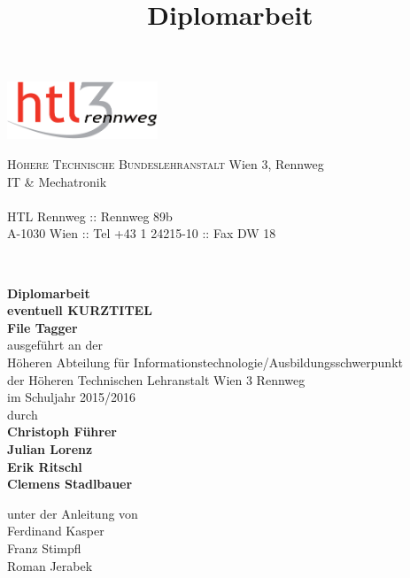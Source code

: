 \documentclass[12pt,a4paper,english,twoside,openright,DIV=12,BCOR=1cm]{scrbook}
\begin{document}
\title{Diplomarbeit}
\begin{titlepage}
\begin{minipage}[b]{1\columnwidth}
\parbox[b]{50mm}{\includegraphics[width=45mm]{images/htl3r-logo}}
\hfill
\parbox[b]{130mm}{\footnotesize \textsc{Höhere Technische Bundeslehranstalt} Wien 3, Rennweg\\
IT \& Mechatronik\\
\\
HTL Rennweg :: Rennweg 89b\\
A-1030 Wien :: Tel +43 1 24215-10 :: Fax DW 18
}\\
\mbox{}
\end{minipage}

\vspace{1cm}


\begin{center}
\textbf{\LARGE{}Diplomarbeit}{\large{}}\\
{\large{}\vspace{15mm}
 }\textbf{\large{}eventuell KURZTITEL}\\
\textbf{\large{}File Tagger}\\
 \vspace{15mm}
 ausgeführt an der\\
 Höheren Abteilung für Informationstechnologie/Ausbildungsschwerpunkt\\
 der Höheren Technischen Lehranstalt Wien 3 Rennweg\\
 \vspace{1cm}
 im Schuljahr 2015/2016\\
 \vspace{1cm}
 durch\\
 \vspace{0.5cm}
\textbf{\large{}Christoph Führer}\\
\textbf{\large{}Julian Lorenz}\\
\textbf{\large{}Erik Ritschl}\\
\textbf{\large{}Clemens Stadlbauer}\\

\par\end{center}{\large \par}

\begin{center}
\vspace{20mm}
 \normalsize unter der Anleitung von\\
 \vspace{0.5cm}
 Ferdinand Kasper\\
Franz Stimpfl\\
Roman Jerabek\\
\par\end{center}


\end{titlepage}
\end{document}

